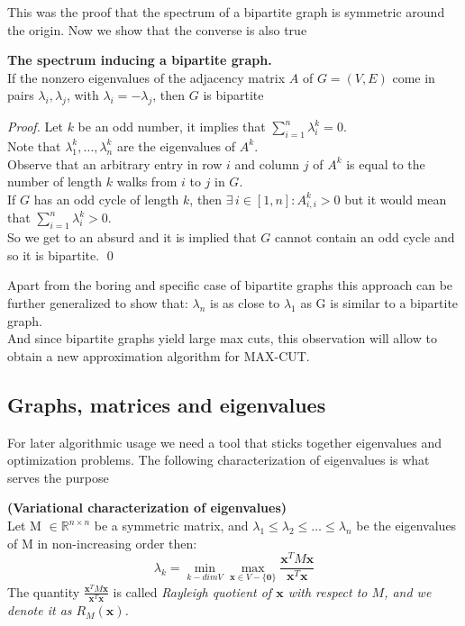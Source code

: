 This was the proof that the spectrum of a bipartite graph is symmetric around the origin. Now we show that the converse is also true
\begin{proposition}{\textbf{The spectrum inducing a bipartite graph.}} \\
If the nonzero eigenvalues of the adjacency matrix $ A $ of $ G=(V,E) $ come in pairs $ \lambda_i, \lambda_j $, with $ \lambda_i = -\lambda_j $, then $ G $ is bipartite
\begin{proof}
Let $ k $ be an odd number, it implies that $ \sum_{i=1}^{n} \lambda_{i}^{k} = 0 $. \\
Note that $ \lambda_1^k, \dots, \lambda_n^k $ are the eigenvalues of $ A^k $. \\
Observe that an arbitrary entry in row $ i $ and column $ j $ of $ A^k $ is equal to the number of length $ k $ walks from $ i $ to $ j $ in $ G $.\\
If $ G $ has an odd cycle of length $ k $, then $ \exists\, i \in [1,n] : A_{i,i}^k > 0 $ but it would mean that $ \sum_{i=1}^{n} \lambda_{i}^{k} > 0 $.\\
So we get to an absurd and it is implied that $ G $ cannot contain an odd cycle and so it is bipartite.
\qed
\end{proof}
\end{proposition}	

Apart from the boring and specific case of bipartite graphs this approach can be further generalized to show that:
$ \lambda_n $ is as close to $ \lambda_1 $ as G is similar to a bipartite graph. \\
And since bipartite graphs yield large max cuts, this observation will allow to obtain a new approximation algorithm for MAX-CUT.

\subsection{Graphs, matrices and eigenvalues}
For later algorithmic usage we need a tool that sticks together eigenvalues and optimization problems. The following characterization of eigenvalues is what serves the purpose

\begin{theorem}{\textbf{(Variational characterization of eigenvalues)}}
	\\
	Let M $\in\mathbb{R}^{n \times n}$ be a symmetric matrix, and $\lambda_1 \leq \lambda_2 \leq \dots \leq \lambda_n$ be the eigenvalues of M in non-increasing order then:
	\[
	\lambda_{k} = \min_{k - dim V} \max_{\textbf{x} \in V - \{\textbf{0}\}} \frac{\textbf{x}^T M \textbf{x}}{\textbf{x}^T \textbf{x}}
	\]
	The quantity $ \frac{\textbf{x}^T M \textbf{x}}{\textbf{x}^T \textbf{x}} $ is called \em{Rayleigh quotient} of $ \mathbf{x} $ with respect to $ M $, and we denote it as $ R_M(\mathbf{x}) $.
\end{theorem}


